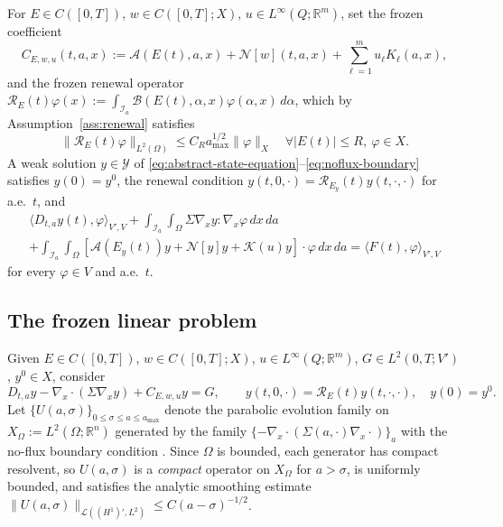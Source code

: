\documentclass[pdflatex,sn-mathphys-num]{sn-jnl}
\theoremstyle{plain}
\theoremstyle{definition}
\theoremstyle{remark}
\newcommand{\R}{\mathbb R}
\begin{document}
For $E\in C([0,T])$, $w\in C([0,T];X)$, $u\in L^\infty(Q;\R^m)$, set the frozen
coefficient
\[
C_{E,w,u}(t,a,x)
:=
\mathcal A(E(t),a,x)
+
\mathcal N[w](t,a,x)
+
\sum_{\ell=1}^m u_\ell K_\ell(a,x),
\]
and the frozen renewal operator
$\displaystyle \mathcal R_E(t)\varphi(x)
:=
\int_{\mathcal I_a}
\mathcal B(E(t),\alpha,x)\varphi(\alpha,x)\,d\alpha $,
which by Assumption~\ref{ass:renewal} satisfies
\begin{equation}
\label{eq:renewal-estimate}
\|\mathcal R_E(t)\varphi\|_{L^2(\Omega)}
\le
C_R a_{\max}^{1/2}\|\varphi\|_X
\quad
\forall |E(t)|\le R,\ \varphi\in X .
\end{equation}
A weak solution $y\in\mathcal Y$ of
\eqref{eq:abstract-state-equation}--\eqref{eq:noflux-boundary} satisfies
$y(0)=y^0$, the renewal condition
$y(t,0,\cdot)=\mathcal R_{E_y}(t)y(t,\cdot,\cdot)$ for a.e.\ $t$, and
\begin{multline*}
\langle D_{t,a}y(t),\varphi\rangle_{V',V}
+
\int_{\mathcal I_a}\int_\Omega
\Sigma\nabla_x y:\nabla_x\varphi\,dx\,da
\\
+
\int_{\mathcal I_a}\int_\Omega
\left[
\mathcal A(E_y(t))y
+
\mathcal N[y]y
+
\mathcal K(u)y
\right]\cdot\varphi\,dx\,da
=
\langle F(t),\varphi\rangle_{V',V}
\end{multline*}
for every $\varphi\in V$ and a.e.\ $t$.

\subsection{The frozen linear problem}
\label{subsec:frozen-linear-problem}
Given $E\in C([0,T])$, $w\in C([0,T];X)$, $u\in L^\infty(Q;\R^m)$,
$G\in L^2(0,T;V')$, $y^0\in X$, consider
\begin{equation}
\label{eq:frozen-linear-equation}
D_{t,a}y
-\nabla_x\cdot(\Sigma\nabla_x y)
+
C_{E,w,u}y
=
G,
\qquad
y(t,0,\cdot)=\mathcal R_E(t)y(t,\cdot,\cdot),
\quad
y(0)=y^0 .
\end{equation}
Let $\{U(a,\sigma)\}_{0\le\sigma\le a\le a_{\max}}$ denote the parabolic
evolution family on $X_\Omega:=L^2(\Omega;\R^n)$ generated by the family
$\{-\nabla_x\cdot(\Sigma(a,\cdot)\nabla_x\cdot)\}_a$ with the no-flux boundary
condition \cite{acquistapace1987unified,pazy2012semigroups,liu2026computational}. Since $\Omega$ is bounded, each
generator has compact resolvent, so $U(a,\sigma)$ is a \emph{compact} operator
on $X_\Omega$ for $a>\sigma$, is uniformly bounded, and satisfies the analytic
smoothing estimate
$\|U(a,\sigma)\|_{\mathcal L((H^1)',L^2)}\le C(a-\sigma)^{-1/2}$.
\end{document}
